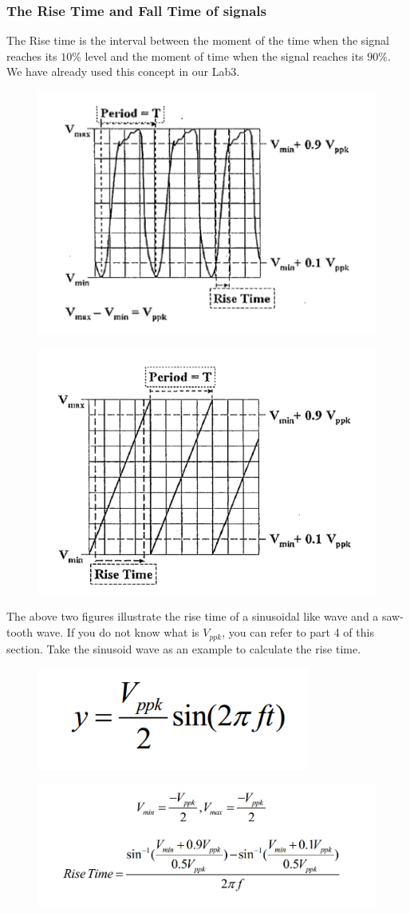 \documentclass{article}
\begin{document}
\subsubsection{The Rise Time and Fall Time of signals}
The Rise time is the interval between the moment of the time when the signal
reaches its $10\%$ level and the moment of time when the signal reaches its $90\%$.
We have already used this concept in our Lab3.
\begin{figure}[H]
	\centering
	\includegraphics[width=0.7\linewidth]{p2}
	\label{fig:p2}
\end{figure}
\begin{figure}[H]
	\centering
	\includegraphics[width=0.7\linewidth]{p3}
	\label{fig:p3}
\end{figure}
The above two figures illustrate the rise time of a sinusoidal like wave and a
saw-tooth wave. If you do not know what is $V_{ppk}$, you can refer to part 4 of this
section.
Take the sinusoid wave as an example to calculate the rise time.
\begin{figure}[H]
	\centering
	\includegraphics[width=0.2\linewidth]{p4}
	\label{fig:p4}
\end{figure}
\begin{figure}[H]
	\centering
	\includegraphics[width=0.4\linewidth]{p5}
	\label{fig:p5}
\end{figure}
\end{document}
